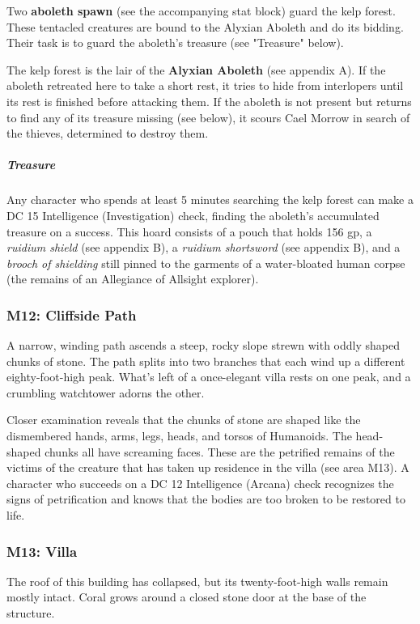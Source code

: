 \documentclass[10pt,a4paper,twoside,bg=print,twocolumn,openany,nodeprecatedcode]{dndbook}
\begin{document}
Two \textbf{aboleth spawn} (see the accompanying stat block) guard the kelp forest. These tentacled creatures are bound to the Alyxian Aboleth and do its bidding. Their task is to guard the aboleth's treasure (see "Treasure" below).

The kelp forest is the lair of the \textbf{Alyxian Aboleth} (see appendix A). If the aboleth retreated here to take a short rest, it tries to hide from interlopers until its rest is finished before attacking them. If the aboleth is not present but returns to find any of its treasure missing (see below), it scours Cael Morrow in search of the thieves, determined to destroy them.

\subparagraph{Treasure}
Any character who spends at least 5 minutes searching the kelp forest can make a DC 15 Intelligence (Investigation) check, finding the aboleth's accumulated treasure on a success. This hoard consists of a pouch that holds 156 gp, a \textit{ruidium shield} (see appendix B), a \textit{ruidium shortsword} (see appendix B), and a \textit{brooch of shielding} still pinned to the garments of a water-bloated human corpse (the remains of an Allegiance of Allsight explorer).

\subsubsection{M12: Cliffside Path}
\begin{DndReadAloud}{}
A narrow, winding path ascends a steep, rocky slope strewn with oddly shaped chunks of stone. The path splits into two branches that each wind up a different eighty-foot-high peak. What's left of a once-elegant villa rests on one peak, and a crumbling watchtower adorns the other.

\end{DndReadAloud}

Closer examination reveals that the chunks of stone are shaped like the dismembered hands, arms, legs, heads, and torsos of Humanoids. The head-shaped chunks all have screaming faces. These are the petrified remains of the victims of the creature that has taken up residence in the villa (see area M13). A character who succeeds on a DC 12 Intelligence (Arcana) check recognizes the signs of petrification and knows that the bodies are too broken to be restored to life.

\subsubsection{M13: Villa}
\begin{DndReadAloud}{}
The roof of this building has collapsed, but its twenty-foot-high walls remain mostly intact. Coral grows around a closed stone door at the base of the structure.

\end{DndReadAloud}
\end{document}
